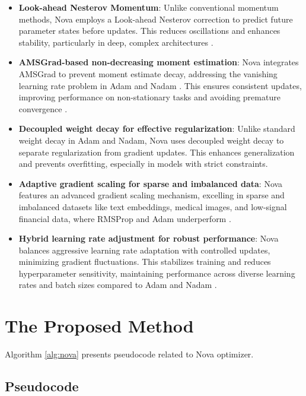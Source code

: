 \documentclass{article}
\begin{document}
\begin{itemize}
\item \textbf{Look-ahead Nesterov Momentum}: Unlike conventional momentum methods, Nova employs a Look-ahead Nesterov correction \cite{nesterov1983method, B4} to predict future parameter states before updates. This reduces oscillations and enhances stability, particularly in deep, complex architectures \cite{Goodfellow2016}.

\item \textbf{AMSGrad-based non-decreasing moment estimation}: Nova integrates AMSGrad \cite{Reddi2018} to prevent moment estimate decay, addressing the vanishing learning rate problem in Adam \cite{kingma2014adam} and Nadam \cite{Dozat2016}. This ensures consistent updates, improving performance on non-stationary tasks and avoiding premature convergence \cite{Wilson2017}.

\item \textbf{Decoupled weight decay for effective regularization}: Unlike standard weight decay in Adam and Nadam, Nova uses decoupled weight decay \cite{Loshchilov2017, B1} to separate regularization from gradient updates. This enhances generalization and prevents overfitting, especially in models with strict constraints.

\item \textbf{Adaptive gradient scaling for sparse and imbalanced data}: Nova features an advanced gradient scaling mechanism, excelling in sparse and imbalanced datasets like text embeddings, medical images, and low-signal financial data, where RMSProp and Adam underperform \cite{Duchi2011}.

\item \textbf{Hybrid learning rate adjustment for robust performance}: Nova balances aggressive learning rate adaptation with controlled updates, minimizing gradient fluctuations. This stabilizes training and reduces hyperparameter sensitivity, maintaining performance across diverse learning rates and batch sizes compared to Adam and Nadam \cite{Sivaprasad2019}.
\end{itemize}


\section{The Proposed Method}\label{Sec 3}

Algorithm  \ref{alg:nova} presents pseudocode related to Nova optimizer.
\subsection{Pseudocode}
\end{document}
